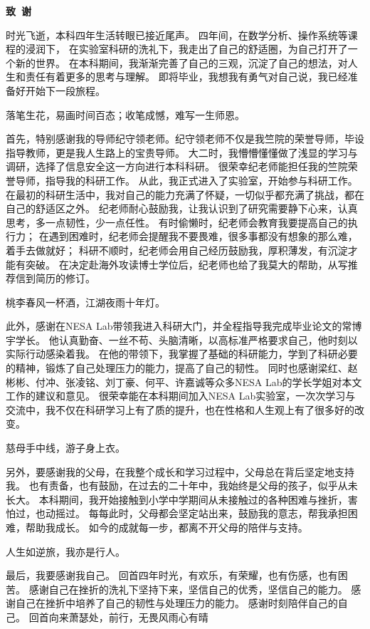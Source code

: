 \cleardoublepage{}
\begin{center}
    \bfseries {} 致~谢
\end{center}

时光飞逝，本科四年生活转眼已接近尾声。
四年间，在数学分析、操作系统等课程的浸润下，
在实验室科研的洗礼下，我走出了自己的舒适圈，为自己打开了一个新的世界。
在本科期间，我渐渐完善了自己的三观，沉淀了自己的想法，对人生和责任有着更多的思考与理解。
即将毕业，我想我有勇气对自己说，我已经准备好开始下一段旅程。

落笔生花，易画时间百态；收笔成憾，难写一生师恩。

首先，特别感谢我的导师纪守领老师。纪守领老师不仅是我竺院的荣誉导师，毕设指导教师，更是我人生路上的宝贵导师。
大二时，我懵懵懂懂做了浅显的学习与调研，选择了信息安全这一方向进行本科科研。
很荣幸纪老师能担任我的竺院荣誉导师，指导我的科研工作。
从此，我正式进入了实验室，开始参与科研工作。
在最初的科研生活中，我对自己的能力充满了怀疑，一切似乎都充满了挑战，都在自己的舒适区之外。
纪老师耐心鼓励我，让我认识到了研究需要静下心来，认真思考，多一点韧性，少一点任性。
有时偷懒时，纪老师会教育我要提高自己的执行力；
在遇到困难时，纪老师会提醒我不要畏难，很多事都没有想象的那么难，着手去做就好；
科研不顺时，纪老师会用自己经历鼓励我，厚积薄发，有沉淀才能有突破。
在决定赴海外攻读博士学位后，纪老师也给了我莫大的帮助，从写推荐信到简历的修订。

桃李春风一杯酒，江湖夜雨十年灯。

此外，感谢在NESA Lab带领我进入科研大门，并全程指导我完成毕业论文的常博宇学长。
他认真勤奋、一丝不苟、头脑清晰，以高标准严格要求自己，他时刻以实际行动感染着我。
在他的带领下，我掌握了基础的科研能力，学到了科研必要的精神，锻炼了自己处理压力的能力，提高了自己的韧性。
同时也感谢梁红、赵彬彬、付冲、张凌铭、刘丁豪、何平、许嘉诚等众多NESA Lab的学长学姐对本文工作的建议和意见。
很荣幸能在本科期间加入NESA Lab实验室，一次次学习与交流中，我不仅在科研学习上有了质的提升，也在性格和人生观上有了很多好的改变。

慈母手中线，游子身上衣。

另外，要感谢我的父母，在我整个成长和学习过程中，父母总在背后坚定地支持我。
也有责备，也有鼓励，在过去的二十年中，我始终是父母的孩子，似乎从未长大。
本科期间，我开始接触到小学中学期间从未接触过的各种困难与挫折，害怕过，也动摇过。
每每此时，父母都会坚定站出来，鼓励我的意志，帮我承担困难，帮助我成长。
如今的成就每一步，都离不开父母的陪伴与支持。

人生如逆旅，我亦是行人。

最后，我要感谢我自己。
回首四年时光，有欢乐，有荣耀，也有伤感，也有困苦。
感谢自己在挫折的洗礼下坚持下来，坚信自己的优秀，坚信自己的能力。
感谢自己在挫折中培养了自己的韧性与处理压力的能力。
感谢时刻陪伴自己的自己。
回首向来萧瑟处，前行，无畏风雨心有晴


